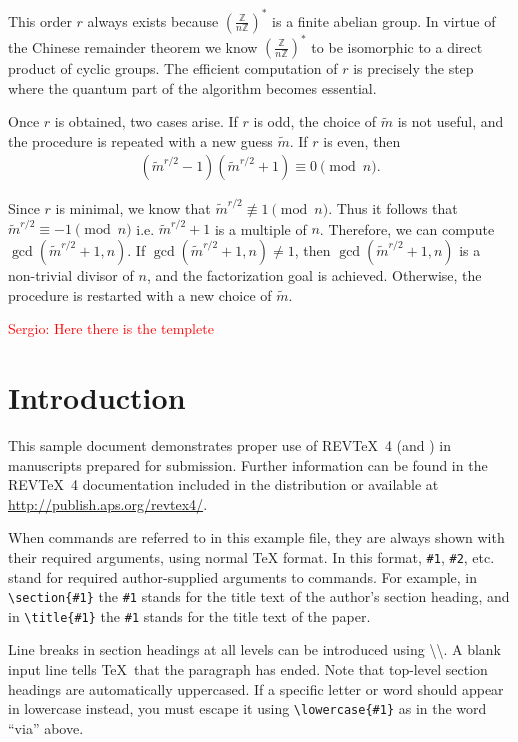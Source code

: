 \documentclass[aps,prl,twocolumn,superscriptaddress,groupedaddress]{revtex4}  %
\begin{document}
This order $r$ always exists because $\left(\tfrac{\mathbb{Z}}{n\mathbb{Z}}\right)^*$ is a finite abelian group. In virtue of the Chinese remainder theorem we know $\left(\tfrac{\mathbb{Z}}{n\mathbb{Z}}\right)^*$ to be isomorphic to a direct product of cyclic groups. The efficient computation of $r$ is precisely the step where the quantum part of the algorithm becomes essential.  

Once $r$ is obtained, two cases arise. If $r$ is odd, the choice of $\tilde{m}$ is not useful, and the procedure is repeated with a new guess $\tilde{m}$. If $r$ is even, then 
\begin{align*}
       (\tilde{m}^{r/2} - 1)(\tilde{m}^{r/2} + 1) \equiv 0 \pmod{n}.
	\end{align*}
	
    Since $r$ is minimal, we know that $\tilde{m}^{r/2} \not\equiv 1 \pmod{n}$. Thus it follows that $\tilde{m}^{r/2} \equiv -1 \pmod{n}$ i.e. $\tilde{m}^{r/2} + 1$ is a multiple of $n$.
    Therefore, we can compute $\gcd(\tilde{m}^{r/2} + 1, n)$.
    If $\gcd(\tilde{m}^{r/2} + 1, n) \neq 1$, then $\gcd(\tilde{m}^{r/2} + 1, n)$ is a non-trivial divisor of $n$, and the factorization goal is achieved. Otherwise, the procedure is restarted with a new choice of $\tilde{m}$.

\textcolor{red}{Sergio: Here there is the templete}
\section{\label{sec:level1}Introduction}

This sample document demonstrates proper use of REV\TeX~4 (and
\LaTeXe) in manuscripts prepared for submission.
 Further information can be found in the REV\TeX~4
documentation included in the distribution or available at
\url{http://publish.aps.org/revtex4/}.

When commands are referred to in this example file, they are always
shown with their required arguments, using normal \TeX{} format. In
this format, \verb+#1+, \verb+#2+, etc. stand for required
author-supplied arguments to commands. For example, in
\verb+\section{#1}+ the \verb+#1+ stands for the title text of the
author's section heading, and in \verb+\title{#1}+ the \verb+#1+
stands for the title text of the paper.

Line breaks in section headings at all levels can be introduced using
\textbackslash\textbackslash. A blank input line tells \TeX\ that the
paragraph has ended. Note that top-level section headings are
automatically uppercased. If a specific letter or word should appear in
lowercase instead, you must escape it using \verb+\lowercase{#1}+ as
in the word ``via'' above.
\end{document}
